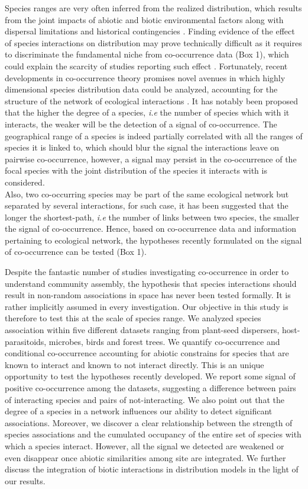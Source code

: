 Species ranges are very often inferred from the realized distribution,
which results from the joint impacts of abiotic and biotic environmental
factors along with dispersal limitations and historical contingencies
\citep{Pulliam2000, Holt2009, Godsoe2010a, Araujo2014}. Finding evidence
of the effect of species interactions on distribution may prove
technically difficult as it requires to discriminate the fundamental
niche from co-occurrence data (Box 1), which could explain the scarcity
of studies reporting such effect \citep[but see][]{Gotelli2010}.
Fortunately, recent developments in co-occurrence theory promises novel
avenues in which highly dimensional species distribution data could be
analyzed, accounting for the structure of the network of ecological
interactions \citep{Cazelles2016}. It has notably been proposed that the
higher the degree of a species, \emph{i.e} the number of species which
with it interacts, the weaker will be the detection of a signal of
co-occurrence. The geographical range of a species is indeed partially
correlated with all the ranges of species it is linked to, which should
blur the signal the interactions leave on pairwise co-occurrence,
however, a signal may persist in the co-occurrence of the focal species
with the joint distribution of the species it interacts with is
considered.\\
Also, two co-occurring species may be part of the same ecological
network but separated by several interactions, for such case, it has
been suggested that the longer the shortest-path, \emph{i.e} the number
of links between two species, the smaller the signal of co-occurrence.
Hence, based on co-occurrence data and information pertaining to
ecological network, the hypotheses recently formulated on the signal of
co-occurrence can be tested (Box 1).

Despite the fantastic number of studies investigating co-occurrence in
order to understand community assembly, the hypothesis that species
interactions should result in non-random associations in space has never
been tested formally. It is rather implicitly assumed in every
investigation. Our objective in this study is therefore to test this at
the scale of species range. We analyzed species association within five
different datasets ranging from plant-seed dispersers, host-parasitoids,
microbes, birds and forest trees. We quantify co-occurrence and
conditional co-occurrence accounting for abiotic constrains for species
that are known to interact and known to not interact directly. This is
an unique opportunity to test the hypotheses recently developed. We
report some signal of positive co-occurrence among the datasets,
suggesting a difference between pairs of interacting species and pairs
of not-interacting. We also point out that the degree of a species in a
network influences our ability to detect significant associations.
Moreover, we discover a clear relationship between the strength of
species associations and the cumulated occupancy of the entire set of
species with which a species interact. However, all the signal we
detected are weakened or even disappear once abiotic similarities among
site are integrated. We further discuss the integration of biotic
interactions in distribution models in the light of our results.

